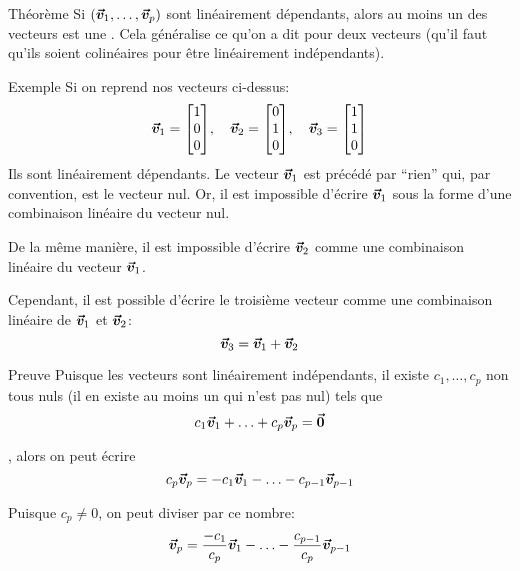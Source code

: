 \documentclass{article}
\begin{document}
\begin{parag}{Théorème}
    Si $\left(\bvec{v}_1, \ldots, \bvec{v}_p\right)$ sont linéairement dépendants, alors au moins un des vecteurs est une . Cela généralise ce qu'on a dit pour deux vecteurs (qu'il faut qu'ils soient colinéaires pour être linéairement indépendants).

    \begin{subparag}{Exemple}
     Si on reprend nos vecteurs ci-dessus:
    \[\bvec{v}_1 = \begin{bmatrix} 1 \\ 0 \\ 0 \end{bmatrix}, \mathspace \bvec{v}_2 = \begin{bmatrix} 0 \\ 1 \\ 0 \end{bmatrix}, \mathspace \bvec{v}_3 = \begin{bmatrix} 1 \\ 1 \\ 0 \end{bmatrix} \]
     Ils sont linéairement dépendants. Le vecteur $\bm{\protect\vec{v}}_1$ est précédé par ``rien'' qui, par convention, est le vecteur nul. Or, il est impossible d'écrire $\bm{\protect\vec{v}}_1$ sous la forme d'une combinaison linéaire du vecteur nul.

     De la même manière, il est impossible d'écrire $\bm{\protect\vec{v}}_2$ comme une combinaison linéaire du vecteur $\bm{\protect\vec{v}}_1$.

     Cependant, il est possible d'écrire le troisième vecteur comme une combinaison linéaire de $\bm{\protect\vec{v}}_1$ et $\bm{\protect\vec{v}}_2$: 
     \[\bm{\protect\vec{v}}_3 = \bm{\protect\vec{v}}_1 + \bm{\protect\vec{v}}_2\]
    \end{subparag}
    

    \begin{subparag}{Preuve}
        Puisque les vecteurs sont linéairement indépendants, il existe $c_1, \ldots, c_p$ non tous nuls (il en existe au moins un qui n'est pas nul) tels que 
        \[c_1 \bm{\protect\vec{v}}_1 + \ldots + c_p \bm{\protect\vec{v}}_p = \bm{\protect\vec{0}}\]
        
        , alors on peut écrire 
        \[c_p \bm{\protect\vec{v}}_p = -c_1 \bm{\protect\vec{v}}_1 - \ldots - c_{p-1} \bm{\protect\vec{v}}_{p-1} \]

        Puisque $c_p \neq 0$, on peut diviser par ce nombre: 
        \[\bm{\protect\vec{v}}_p = \frac{-c_1}{c_p}\bm{\protect\vec{v}}_1 - \ldots - \frac{c_{p-1}}{c_p}\bm{\protect\vec{v}}_{p-1}\]
        

\end{subparag}
\end{parag}
\end{document}
